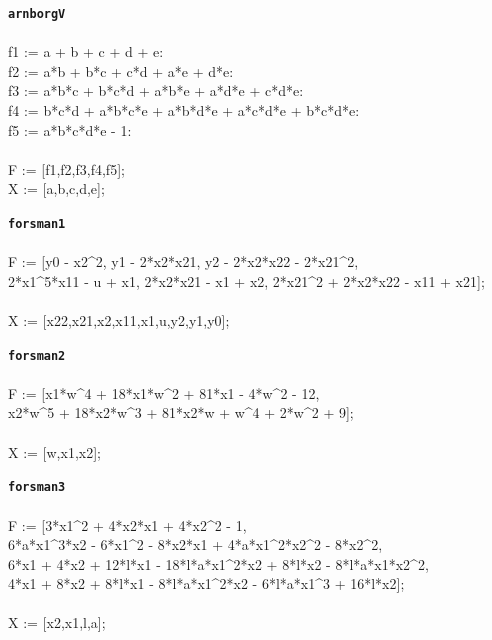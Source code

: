 \documentclass[letterpaper,12pt,titlepage,oneside,final]{book}
\newenvironment{codefont}{\ttfamily}{\par}
\begin{document}
\begin{appendices}
\noindent\textbf{\texttt{arnborgV}}\\\\
\noindent\begin{codefont}
  f1 := a + b + c + d + e:\\
  f2 := a*b + b*c + c*d + a*e + d*e:\\
  f3 := a*b*c + b*c*d + a*b*e + a*d*e + c*d*e:\\
  f4 := b*c*d + a*b*c*e + a*b*d*e + a*c*d*e + b*c*d*e:\\
  f5 := a*b*c*d*e - 1:\\
  \\
  F := [f1,f2,f3,f4,f5];\\
  X := [a,b,c,d,e];\\
\end{codefont}

\noindent\textbf{\texttt{forsman1}}\\\\
\noindent\begin{codefont}
  F := [y0 - x2\^{}2, y1 - 2*x2*x21, y2 - 2*x2*x22 - 2*x21\^{}2,\\
      2*x1\^{}5*x11 - u + x1, 2*x2*x21 - x1 + x2, 2*x21\^{}2 + 2*x2*x22 - x11 + x21];\\
  \\
  X := [x22,x21,x2,x11,x1,u,y2,y1,y0];\\
\end{codefont}

\noindent\textbf{\texttt{forsman2}}\\\\
\noindent\begin{codefont}
  F := [x1*w\^{}4 + 18*x1*w\^{}2 + 81*x1 - 4*w\^{}2 - 12,\\
      x2*w\^{}5 + 18*x2*w\^{}3 + 81*x2*w + w\^{}4 + 2*w\^{}2 + 9];\\
  \\
  X := [w,x1,x2];
\end{codefont}

\noindent\textbf{\texttt{forsman3}}\\\\
\noindent\begin{codefont}
  F := [3*x1\^{}2 + 4*x2*x1 + 4*x2\^{}2 - 1,\\
  6*a*x1\^{}3*x2 - 6*x1\^{}2 - 8*x2*x1 + 4*a*x1\^{}2*x2\^{}2 - 8*x2\^{}2,\\
  6*x1 + 4*x2 + 12*l*x1 - 18*l*a*x1\^{}2*x2 + 8*l*x2 - 8*l*a*x1*x2\^{}2,\\
  4*x1 + 8*x2 + 8*l*x1 - 8*l*a*x1\^{}2*x2 - 6*l*a*x1\^{}3 + 16*l*x2];\\
        \\
  X := [x2,x1,l,a];\\
\end{codefont}


\end{appendices}
\end{document}
